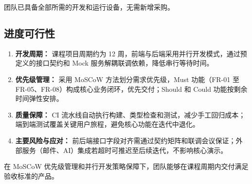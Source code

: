 \documentclass[12pt,a4paper]{ctexart}
\begin{document}
  团队已具备全部所需的开发和运行设备，无需新增采购。

  \subsection{进度可行性}

  \begin{enumerate}
  \item \textbf{开发周期：} 课程项目周期约为 12 周，前端与后端采用并行开发模式，通过预定义的接口契约和 Mock 服务解耦联调依赖，降低串行等待时间。
  \item \textbf{优先级管理：} 采用 MoSCoW 方法划分需求优先级，Must 功能（FR-01 至 FR-05、FR-08）构成核心业务闭环，优先交付；Should 和 Could 功能按剩余时间弹性安排。
  \item \textbf{质量保障：} CI 流水线自动执行构建、类型检查和测试，减少手工回归成本；端到端测试覆盖关键用户旅程，避免核心功能在迭代中退化。
  \item \textbf{主要风险与应对：} 前后端接口字段对齐需通过契约矩阵和联调会议保证；外部服务（邮件、AI）集成若超时可推迟至后续迭代，不影响核心演示。
  \end{enumerate}

  在 MoSCoW 优先级管理和并行开发策略保障下，团队能够在课程周期内交付满足验收标准的产品。

  
\end{document}
